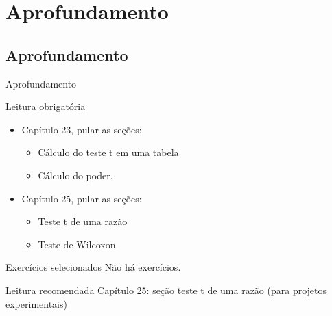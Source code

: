 \documentclass{beamer}
\begin{document}
\section{Aprofundamento}

\subsection{Aprofundamento}

\begin{frame}{Aprofundamento}
  \begin{block}{Leitura obrigatória}
    \begin{itemize}
      \small
    \item Capítulo 23, pular as seções:
      \begin{itemize}
        \scriptsize
      \item Cálculo do teste t em uma tabela
      \item Cálculo do poder.
      \end{itemize}
    \item Capítulo 25, pular as seções:
      \begin{itemize}
        \scriptsize
      \item Teste t de uma razão
      \item Teste de Wilcoxon
      \end{itemize}
    \end{itemize}
  \end{block}
  \begin{block}{Exercícios selecionados}
    \footnotesize
    Não há exercícios.
  \end{block}
  \begin{block}{Leitura recomendada}
    \footnotesize
    Capítulo 25: seção teste t de uma razão (para projetos experimentais)
  \end{block}
\end{frame}
\end{document}
